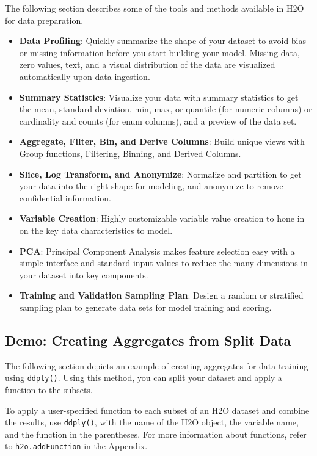 \documentclass[11pt]{article}
\begin{document}
{The following section describes some of the tools and methods available in H2O for data preparation. 
\begin{itemize}
\item {\textbf{Data Profiling}}: Quickly summarize the shape of your dataset to avoid bias or missing information before you start building your model. Missing data, zero values, text, and a visual distribution of the data are visualized automatically upon data ingestion. 
\item {\textbf{Summary Statistics}}: Visualize your data with summary statistics to get the mean, standard deviation, min, max, or quantile (for numeric columns) or cardinality and counts (for enum columns), and a preview of the data set. 
\item {\textbf{Aggregate, Filter, Bin, and Derive Columns}}: Build unique views with Group functions, Filtering, Binning, and Derived Columns. 
\item {\textbf{Slice, Log Transform, and Anonymize}}: Normalize and partition to get your data into the right shape for modeling, and anonymize to remove confidential information. 
\item {\textbf{Variable Creation}}: Highly customizable variable value creation to hone in on the key data characteristics to model. 
\item {\textbf{PCA}}: Principal Component Analysis makes feature selection easy with a simple interface and standard input values to reduce the many dimensions in your dataset into key components. 
\item {\textbf{Training and Validation Sampling Plan}}: Design a random or stratified sampling plan to generate data sets for model training and scoring. 
\end{itemize}

\subsection{Demo: Creating Aggregates from Split Data}

The following section depicts an example of creating aggregates for data training using {\texttt{ddply()}}. Using this method, you can split your dataset and apply a function to the subsets.

To apply a user-specified function to each subset of an H2O dataset and combine the results, use {\texttt{ddply()}}, with the name of the H2O object, the variable name, and the function in the parentheses. For more information about functions, refer to {\texttt{h2o.addFunction}} in the Appendix.

}
\end{document}

